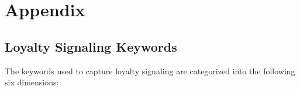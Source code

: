 \documentclass[9pt,a4paper,twocolumn,twoside]{rho-class/rho}
\begin{document}

\printbibliography




\cleardoublepage
\section*{Appendix}
\setcounter{subsection}{0}
\renewcommand{\thesubsection}{\Alph{subsection}}

\subsection{Loyalty Signaling Keywords}
    
    The keywords used to capture loyalty signaling are categorized into the following six dimensions:
\end{document}
